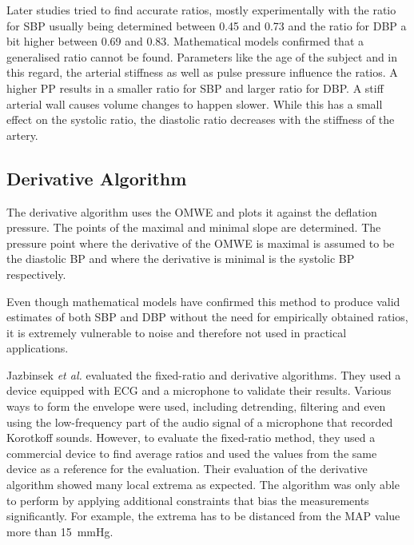 Later studies tried to find accurate ratios, mostly experimentally with the ratio for SBP usually being determined between 0.45 and 0.73 and the ratio for DBP a bit higher between 0.69 and 0.83.\cite{Drzewiecki1994,Forouzanfar2015} Mathematical models confirmed that a generalised ratio cannot be found. Parameters like the age of the subject and in this regard, the arterial stiffness as well as pulse pressure influence the ratios. \cite{Ursino1996} A higher PP results in a smaller ratio for SBP and larger ratio for DBP. A stiff arterial wall causes volume changes to happen slower. While this has a small effect on the systolic ratio, the diastolic ratio decreases with the stiffness of the artery.\cite{Babbs2012}



\subsection{Derivative Algorithm}
The derivative algorithm uses the OMWE and plots it against the deflation pressure. The points of the maximal and minimal slope are determined. The pressure point where the derivative of the OMWE is maximal is assumed to be the diastolic BP and where the derivative is minimal is the systolic BP respectively. \cite{Jazbinsek2010,Forouzanfar2015}

Even though mathematical models have confirmed this method to produce valid estimates of both SBP and DBP without the need for empirically obtained ratios, it is extremely vulnerable to noise and therefore not used in practical applications.  \cite{Babbs2012,Chandrasekhar2019}

Jazbinsek \textit{et al.} evaluated the fixed-ratio and derivative algorithms. They used a device equipped with ECG and a microphone to validate their results. Various ways to form the envelope were used, including detrending, filtering and even using the low-frequency part of the audio signal of a microphone that recorded Korotkoff sounds. However, to evaluate the fixed-ratio method, they used a commercial device to find average ratios and used the values from the same device as a reference for the evaluation. Their evaluation of the derivative algorithm showed many local extrema as expected. The algorithm was only able to perform by applying additional constraints that bias the measurements significantly. For example, the extrema has to be distanced from the MAP value more than \SI{15}{\mmHg}. \cite{Jazbinsek2010,Jazbinsek2005,Jazbinsek2016}


